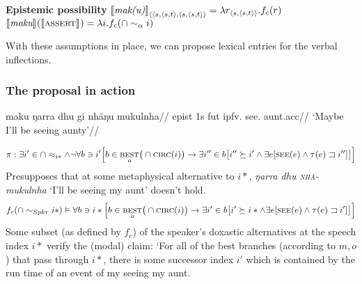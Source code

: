 	
	\pex \textbf{Epistemic possibility}
	\a$\denote[]{\textit{mak(u)}}_{\langle\langle s,\langle s,t\rangle,\langle s,\langle s,t\rangle\rangle} = \lambda r_{\langle s,\langle s,t\rangle\rangle}.f_c(r)$
	\a$ \denote{\textit{maku}}(\denote{\textsc{assert}}) =\lambda i.f_c(\cap\sim_\alpha i)$
	\label{sec:epist}
	
	
	
	\xe
	
	
	With these assumptions in place, we can propose lexical entries for the verbal inflections.

\subsubsection{The proposal in action}

\pex\begingl\gla maku ŋarra dhu gi nhäŋu mukulnha//
\glb \gls{epist} 1s \gls{fut} \gls{ipfv}.\II{} see.\II{} aunt.\gls{acc}//
\glft `Maybe I'll be seeing aunty'//\endgl\


{\small$$ \pi:\exists i'\in\cap\approx_{i*}\wedge\neg\forall b\ni i'\Big[b\in\underset{o}{\textsc{best}}\big(\cap\textsc{circ}(i)\big)\to\exists i''\in b\big[i''\succeq i'\wedge\exists e[\textsc{see}(e)\wedge\tau(e)\sqsupset i'']\big]\Big] $$}
Presupposes that at some metaphysical alternative to $ i* $, \textit{ŋarra dhu \textsc{nhä-} mukulnha} `I'll be seeing my aunt' doesn't hold.
$$ f_c(\cap\sim_{Spkr}i*)\vDash\forall b\ni i*\Big[b\in\underset{o}{\textsc{best}}\big(\cap\textsc{circ}(i)\big)\to\exists i'\in b\big[i'\succeq i*\wedge\exists e[\textsc{see}(e)\wedge\tau(e)\sqsupset i']\big]\Big] $$
Some subset (as defined by $ f_c $) of the speaker's doxastic alternatives at the speech index $ i* $ verify the (modal) claim: `For all of the best branches (according to $ m,o $) that pass through $ i* $, there is some successor index $ i' $ which is contained by the run time of an event of my seeing my aunt.

